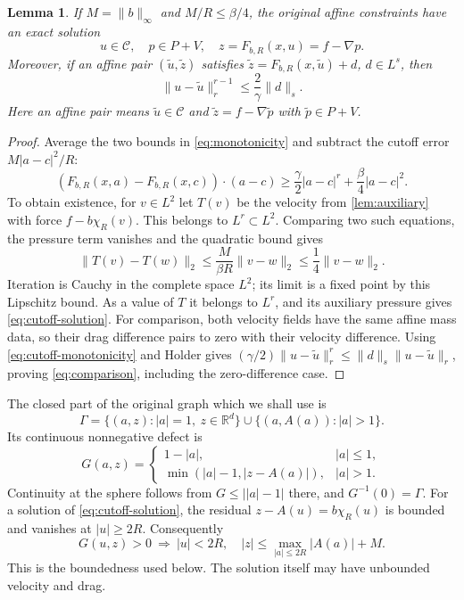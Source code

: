\documentclass[11pt]{article}
\newtheorem{lemma}[lemma]{Lemma}
\theoremstyle{remark}
\newcommand{\R}{\mathbb R}
\newcommand{\norm}[2]{\lVert #1\rVert_{#2}}
\begin{document}
\begin{lemma}\label{lem:cutoff}
If $M=\norm{b}{\infty}$ and $M/R\le\beta/4$, the original affine
constraints have an exact solution
\begin{equation}\label{eq:cutoff-solution}
 u\in\mathcal C,\quad p\in P+V,\quad
 z=F_{b,R}(x,u)=f-\nabla p.
\end{equation}
Moreover, if an affine pair $(\widetilde u,\widetilde z)$ satisfies
$\widetilde z=F_{b,R}(x,\widetilde u)+d$, $d\in L^s$, then
\begin{equation}\label{eq:comparison}
 \norm{u-\widetilde u}{r}^{r-1}\le\frac2\gamma\norm{d}{s}.
\end{equation}
Here an affine pair means $\widetilde u\in\mathcal C$ and
$\widetilde z=f-\nabla\widetilde p$ with $\widetilde p\in P+V$.
\end{lemma}
\begin{proof}
Average the two bounds in \eqref{eq:monotonicity} and subtract the
cutoff error $M|a-c|^2/R$:
\begin{equation}\label{eq:cutoff-monotonicity}
 (F_{b,R}(x,a)-F_{b,R}(x,c))\cdot(a-c)
 \ge\frac\gamma2|a-c|^r+\frac\beta4|a-c|^2.
\end{equation}
To obtain existence, for $v\in L^2$ let $T(v)$ be the velocity from
\cref{lem:auxiliary} with force $f-b\chi_R(v)$. This belongs to
$L^r\subset L^2$. Comparing two such equations, the pressure term
vanishes and the quadratic bound gives
\[
 \norm{T(v)-T(w)}2\le\frac{M}{\beta R}\norm{v-w}2
 \le\frac14\norm{v-w}2.
\]
Iteration is Cauchy in the complete space $L^2$; its limit is a fixed
point by this Lipschitz bound. As a value of $T$ it belongs to $L^r$,
and its auxiliary pressure gives \eqref{eq:cutoff-solution}.
For comparison, both velocity fields have the same affine mass data,
so their drag difference pairs to zero with their velocity difference.
Using \eqref{eq:cutoff-monotonicity} and Holder gives
$(\gamma/2)\norm{u-\widetilde u}{r}^r
 \le\norm{d}{s}\norm{u-\widetilde u}{r}$, proving
\eqref{eq:comparison}, including the zero-difference case.
\end{proof}

The closed part of the original graph which we shall use is
\begin{equation}\label{eq:graph}
 \Gamma=\{(a,z):|a|=1,\ z\in\R^d\}
 \cup\{(a,A(a)):|a|>1\}.
\end{equation}
Its continuous nonnegative defect is
\begin{equation}\label{eq:defect}
 G(a,z)=\begin{cases}
 1-|a|,&|a|\le1,\\
 \min(|a|-1,|z-A(a)|),&|a|>1.
 \end{cases}
\end{equation}
Continuity at the sphere follows from $G\le\big||a|-1\big|$ there,
and $G^{-1}(0)=\Gamma$.
For a solution of \eqref{eq:cutoff-solution}, the residual
$z-A(u)=b\chi_R(u)$ is bounded and vanishes at $|u|\ge2R$.
Consequently
\begin{equation}\label{eq:defect-bound}
 G(u,z)>0\ \Longrightarrow\ |u|<2R,\quad
 |z|\le\max_{|a|\le2R}|A(a)|+M.
\end{equation}
This is the boundedness used below. The solution itself may have
unbounded velocity and drag.
\end{document}
